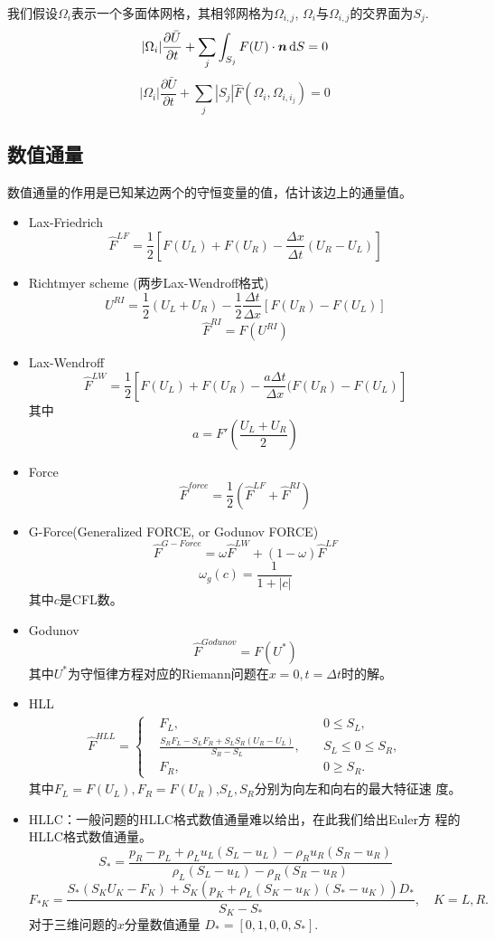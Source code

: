 \documentclass[a4paper,  11pt]{ctexart}
\newcommand\dd{\,\mathrm{d}}
\newcommand\pd[2]{\dfrac{\partial {#1}}{\partial {#2}}}
\newcommand{\bm}[1]{\mbox{\boldmath{$#1$}}}
\begin{document}
我们假设$\Omega_i$表示一个多面体网格，其相邻网格为$\Omega_{i,j}$,
$\Omega_i$与$\Omega_{i,j}$的交界面为$S_j$.
\[  
   |\Omega_i|\pd{\bar{U}}{t} + \sum_{j} \int_{S_j} F(U)\cdot \bm{n}
   \dd S = 0
\]
\[   
|\Omega_i|\pd{\bar{U}}{t} + \sum_{j}|S_j| \hat{F}(\Omega_i,\Omega_{i,i_j})= 0 
\] 
\subsection{数值通量}
数值通量的作用是已知某边两个的守恒变量的值，估计该边上的通量值。
\begin{itemize}
  \item Lax-Friedrich
    \[  
    \hat{F}^{LF} = \frac 12[F(U_L)+F(U_R)-\frac{\Delta
    x}{\Delta t}(U_R-U_L)]
    \]
  \item Richtmyer scheme (两步Lax-Wendroff格式)
    \[  
    U^{RI} = \frac 12(U_L+U_R) - \frac 12\frac{\Delta t}
    {\Delta x}[F(U_R)-F(U_L)]
    \]
    \[
    \hat{F}^{RI} = F(U^{RI})
    \]
  \item Lax-Wendroff 
    \[
    \hat{F}^{LW} = \frac 12[F(U_L)+F(U_R)-\frac{a\Delta t}{
    \Delta x}(F(U_R)-F(U_L)]
    \]
    其中\[
    a = F'\left(\frac{U_L+U_R}{2}\right)
    \]
  \item Force 
    \[ 
    \hat{F}^{force} = \frac 12 (\hat{F}^{LF}+\hat{F}^{RI})
    \]
  \item G-Force(Generalized FORCE, or Godunov FORCE)
    \[
    \hat{F}^{G-Force} = \omega \hat{F}^{LW} + (1-\omega)
    \hat{F}^{LF}
    \]
    \[
    \omega_g(c) = \frac{1}{1+|c|}
    \]
    其中$c$是CFL数。
  \item Godunov 
    \[  
       \hat{F}^{Godunov} = F(U^*)
    \]
    其中$U^*$为守恒律方程对应的Riemann问题在$x=0,t=\Delta t$时的解。
  \item HLL
    \begin{align*}
      \hat{F}^{HLL}=\left\{
      \begin{aligned}
        &F_L,\quad &0\leq S_L, \\
        &\frac{S_RF_L-S_LF_R+S_LS_R(U_R-U_L)}{S_R-S_L},\quad &
        S_L\leq 0\leq S_R,\\
        &F_R,\quad &0\geq S_R.
      \end{aligned}
      \right.
    \end{align*}
    其中$F_L=F(U_L),F_R=F(U_R)$,$S_L,S_R$分别为向左和向右的最大特征速
    度。
  \item HLLC：一般问题的HLLC格式数值通量难以给出，在此我们给出Euler方
    程的HLLC格式数值通量。
    \[
    S_* = \frac{p_R-p_L+\rho_Lu_L(S_L-u_L)-\rho_Ru_R(S_R-u_R)}
    {\rho_L(S_L-u_L)-\rho_R(S_R-u_R)}
    \]
    \[ 
    F_{*K} =
    \frac{S_*(S_KU_K-F_K)+S_K(p_K+\rho_L(S_K-u_K)(S_*-u_K))D_*}
    {S_K-S_*},\quad  K=L,R.
    \] 
      对于三维问题的$x$分量数值通量 $D_*=[0,1,0,0,S_*].$
    

\end{itemize}
\end{document}
